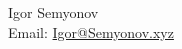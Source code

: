 


\center    
    {\huge Igor Semyonov} \\
    Email: \href{mailto:igor@semyonov.xyz}{Igor@Semyonov.xyz}

\raggedright
